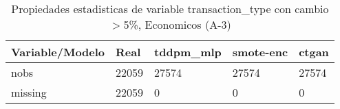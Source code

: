 \begin{table}[H]
\centering
\fontsize{8}{14}\selectfont
\caption{Propiedades estadisticas de variable transaction\_type con cambio\ensuremath{>}5\%, Economicos (A-3)}
\label{table-stats-economicos-a-3-transaction_type-short}
\begin{tabular}{|l|m{10em}|m{10em}|m{10em}|m{10em}|}
\hline
 \rowcolor[gray]{0.8}
Variable/Modelo & Real & tddpm\_mlp & smote-enc & ctgan \\
\hline nobs & 22059 & 27574 & 27574 & 27574 \\
\hline missing & 22059 & 0 & 0 & 0 \\
\hline
\end{tabular}
\end{table}
